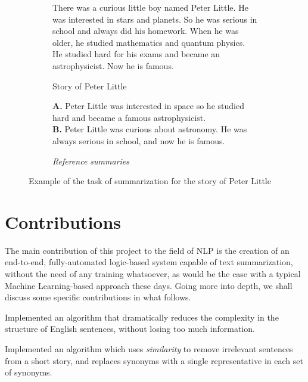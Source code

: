 \begin{figure}[H]
\begin{subfigure}{\textwidth}
\begin{displayquote}
There was a curious little boy named Peter Little. He was interested in stars and planets. So he was serious in school and always did his homework. When he was older, he studied mathematics and quantum physics. He studied hard for his exams and became an astrophysicist. Now he is famous.
\end{displayquote}
\caption{Story of Peter Little}
\vspace{\baselineskip}
\end{subfigure}
\begin{subfigure}{\textwidth}
\begin{displayquote}
\textbf{A.} Peter Little was interested in space so he studied hard and became a famous astrophysicist.\\
\textbf{B.} Peter Little was curious about astronomy. He was always serious in school, and now he is famous.
\end{displayquote}
\caption{\textit{Reference summaries}}
\end{subfigure}
\caption{Example of the task of summarization for the story of Peter Little}
\label{fig:peter_little}
\end{figure}

\section{Contributions}

The main contribution of this project to the field of NLP is the creation of an end-to-end, fully-automated logic-based system capable of text summarization, without the need of any training whatsoever, as would be the case with a typical Machine Learning-based approach these days. Going more into depth, we shall discuss some specific contributions in what follows.

\begin{contribution}
Implemented an algorithm that dramatically reduces the complexity in the structure of English sentences, without losing too much information.
\end{contribution}

\begin{contribution}
Implemented an algorithm which uses \textit{similarity} to remove irrelevant sentences from a short story, and replaces synonyms with a single representative in each set of synonyms.
\end{contribution}

